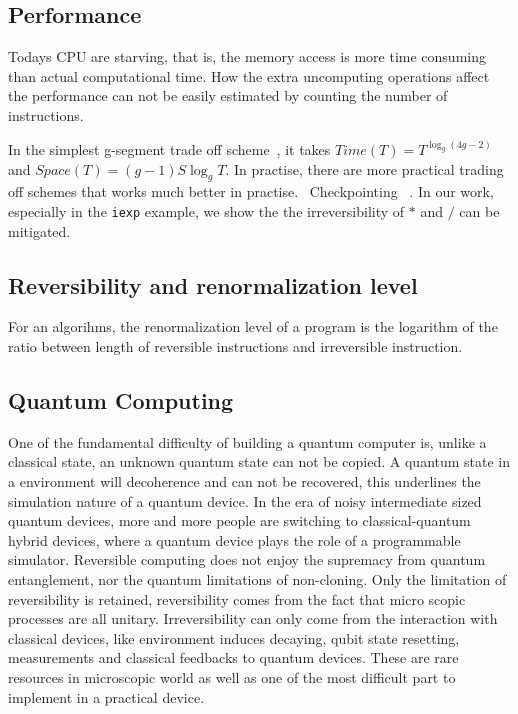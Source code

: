 \documentclass{article}
\newcommand{\<}{\langle}
\renewcommand{\>}{\rangle}
\begin{document}
\subsection{Performance}
Todays CPU are starving, that is, the memory access is more time consuming than actual computational time.
How the extra uncomputing operations affect the performance can not be easily estimated by counting the number of instructions.

In the simplest g-segment trade off scheme~\cite{}, it takes $Time(T) = T^{\log _g(4g-2)}$ and $Space(T) = (g-1)S\log_g T$.
In practise, there are more practical trading off schemes that works much better in practise.~\cite{}
Checkpointing ~\cite{Chen2016}.
In our work, especially in the \texttt{iexp} example, we show the the irreversibility of $*$ and $/$ can be mitigated.

\subsection{Reversibility and renormalization level}
    For an algorihms, the renormalization level of a program is the logarithm of the ratio between length of reversible instructions and irreversible instruction.

\subsection{Quantum Computing}
One of the fundamental difficulty of building a quantum computer is, unlike a classical state, an unknown quantum state can not be copied.
A quantum state in a environment will decoherence and can not be recovered, this underlines the simulation nature of a quantum device.
In the era of noisy intermediate sized quantum devices, more and more people are switching to classical-quantum hybrid devices, where a quantum device plays the role of a programmable simulator.
Reversible computing does not enjoy the supremacy from quantum entanglement, nor the quantum limitations of non-cloning.
Only the limitation of reversibility is retained, reversibility comes from the fact that micro scopic processes are all unitary.
Irreversibility can only come from the interaction with classical devices, like environment induces decaying, qubit state resetting, measurements and classical feedbacks to quantum devices. These are rare resources in microscopic world as well as one of the most difficult part to implement in a practical device.
\end{document}
